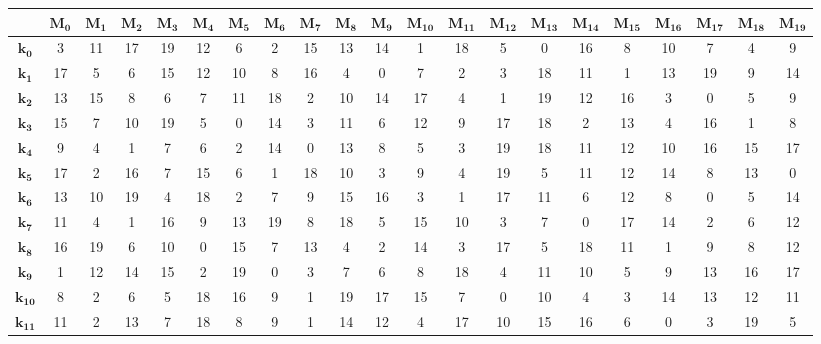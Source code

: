 \documentclass[a4paper,12pt]{article}
\begin{document}
\begin{table}[H]
    \centering
    \begin{adjustbox}{scale=0.82,center}
    \begin{tabular}{|*{21}{c|}}
    \hline
        & $\mathbf{M_0}$ & $\mathbf{M_1}$ & $\mathbf{M_2}$ & $\mathbf{M_3}$ & $\mathbf{M_4}$ & $\mathbf{M_5}$ & $\mathbf{M_6}$ & $\mathbf{M_7}$ & $\mathbf{M_8}$ & $\mathbf{M_9}$ & $\mathbf{M_{10}}$ & $\mathbf{M_{11}}$ & $\mathbf{M_{12}}$ & $\mathbf{M_{13}}$ & $\mathbf{M_{14}}$ & $\mathbf{M_{15}}$ & $\mathbf{M_{16}}$ & $\mathbf{M_{17}}$ & $\mathbf{M_{18}}$ & $\mathbf{M_{19}}$ \\
    \hline
        $\mathbf{k_0}$ & 3 & 11 & 17 & 19 & 12 & 6 & 2 & 15 & 13 & 14 & 1 & 18 & 5 & 0 & 16 & 8 & 10 & 7 & 4 & 9 \\ \hline
        $\mathbf{k_1}$ & 17 & 5 & 6 & 15 & 12 & 10 & 8 & 16 & 4 & 0 & 7 & 2 & 3 & 18 & 11 & 1 & 13 & 19 & 9 & 14 \\ \hline
        $\mathbf{k_2}$ & 13 & 15 & 8 & 6 & 7 & 11 & 18 & 2 & 10 & 14 & 17 & 4 & 1 & 19 & 12 & 16 & 3 & 0 & 5 & 9 \\ \hline
        $\mathbf{k_3}$ & 15 & 7 & 10 & 19 & 5 & 0 & 14 & 3 & 11 & 6 & 12 & 9 & 17 & 18 & 2 & 13 & 4 & 16 & 1 & 8 \\ \hline
        $\mathbf{k_4}$ & 9 & 4 & 1 & 7 & 6 & 2 & 14 & 0 & 13 & 8 & 5 & 3 & 19 & 18 & 11 & 12 & 10 & 16 & 15 & 17 \\ \hline
        $\mathbf{k_5}$ & 17 & 2 & 16 & 7 & 15 & 6 & 1 & 18 & 10 & 3 & 9 & 4 & 19 & 5 & 11 & 12 & 14 & 8 & 13 & 0 \\ \hline
        $\mathbf{k_6}$ & 13 & 10 & 19 & 4 & 18 & 2 & 7 & 9 & 15 & 16 & 3 & 1 & 17 & 11 & 6 & 12 & 8 & 0 & 5 & 14 \\ \hline
        $\mathbf{k_7}$ & 11 & 4 & 1 & 16 & 9 & 13 & 19 & 8 & 18 & 5 & 15 & 10 & 3 & 7 & 0 & 17 & 14 & 2 & 6 & 12 \\ \hline
        $\mathbf{k_8}$ & 16 & 19 & 6 & 10 & 0 & 15 & 7 & 13 & 4 & 2 & 14 & 3 & 17 & 5 & 18 & 11 & 1 & 9 & 8 & 12 \\ \hline
        $\mathbf{k_9}$ & 1 & 12 & 14 & 15 & 2 & 19 & 0 & 3 & 7 & 6 & 8 & 18 & 4 & 11 & 10 & 5 & 9 & 13 & 16 & 17 \\ \hline
        $\mathbf{k_{10}}$ & 8 & 2 & 6 & 5 & 18 & 16 & 9 & 1 & 19 & 17 & 15 & 7 & 0 & 10 & 4 & 3 & 14 & 13 & 12 & 11 \\ \hline
        $\mathbf{k_{11}}$ & 11 & 2 & 13 & 7 & 18 & 8 & 9 & 1 & 14 & 12 & 4 & 17 & 10 & 15 & 16 & 6 & 0 & 3 & 19 & 5 \\ \hline

\end{tabular}
\end{adjustbox}
\end{table}
\end{document}
